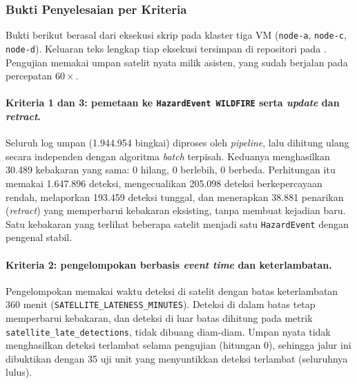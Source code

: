 \subsubsection{Bukti Penyelesaian per Kriteria}

Bukti berikut berasal dari eksekusi skrip pada klaster tiga VM (\texttt{node-a}, \texttt{node-c}, \texttt{node-d}). Keluaran teks lengkap tiap eksekusi tersimpan di repositori pada . Pengujian memakai umpan satelit nyata milik asisten, yang sudah berjalan pada percepatan $60\times$.


\paragraph*{Kriteria 1 dan 3: pemetaan ke \texttt{HazardEvent WILDFIRE} serta \textit{update} dan \textit{retract}.}
Seluruh log umpan (1.944.954 bingkai) diproses oleh \textit{pipeline}, lalu dihitung ulang secara independen dengan algoritma \textit{batch} terpisah. Keduanya menghasilkan 30.489 kebakaran yang sama: 0 hilang, 0 berlebih, 0 berbeda. Perhitungan itu memakai 1.647.896 deteksi, mengecualikan 205.098 deteksi berkepercayaan rendah, melaporkan 193.459 deteksi tunggal, dan menerapkan 38.881 penarikan (\textit{retract}) yang memperbarui kebakaran eksisting, tanpa membuat kejadian baru. Satu kebakaran yang terlihat beberapa satelit menjadi satu \texttt{HazardEvent} dengan pengenal stabil.

\paragraph*{Kriteria 2: pengelompokan berbasis \textit{event time} dan keterlambatan.}
Pengelompokan memakai waktu deteksi di satelit dengan batas keterlambatan 360 menit (\texttt{SATELLITE\_LATENESS\_MINUTES}). Deteksi di dalam batas tetap memperbarui kebakaran, dan deteksi di luar batas dihitung pada metrik \texttt{satellite\_late\_detections}, tidak dibuang diam-diam. Umpan nyata tidak menghasilkan deteksi terlambat selama pengujian (hitungan 0), sehingga jalur ini dibuktikan dengan 35 uji unit yang menyuntikkan deteksi terlambat (seluruhnya lulus).

